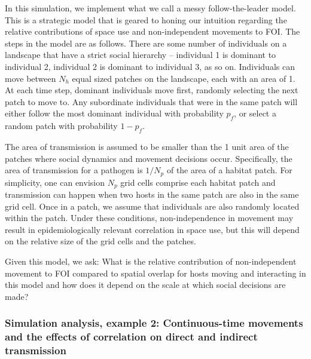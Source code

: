 \documentclass[letterpaper]{article}
\begin{document}
In this simulation, we implement what we call a messy follow-the-leader model.  This is a strategic model that is geared to honing our intuition regarding the relative contributions of space use and non-independent movements to FOI. The steps in the model are as follows. There are some number of individuals on a landscape that have a strict social hierarchy -- individual 1 is dominant to individual 2, individual 2 is dominant to individual 3, as so on. Individuals can move between $N_h$ equal sized patches on the landscape, each with an area of 1. At each time step, dominant individuals move first, randomly selecting the next patch to move to. Any subordinate individuals that were in the same patch will either follow the most dominant individual with probability $p_f$, or select a random patch with probability $1 - p_f$.

The area of transmission is assumed to be smaller than the 1 unit area of the patches where social dynamics and movement decisions occur. Specifically, the area of transmission for a pathogen is $1 / N_p$ of the area of a habitat patch.  For simplicity, one can envision $N_p$ grid cells comprise each habitat patch and transmission can happen when two hosts in the same patch are also in the same grid cell. Once in a patch, we assume that individuals are also randomly located within the patch. Under these conditions, non-independence in movement may result in epidemiologically relevant correlation in space use, but this will depend on the relative size of the grid cells and the patches. 

Given this model, we ask: What is the relative contribution of non-independent movement to FOI compared to spatial overlap for hosts moving and interacting in this model and how does it depend on the scale at which social decisions are made?

\subsubsection*{Simulation analysis, example 2: Continuous-time movements and the effects of correlation on direct and indirect transmission}
\end{document}
